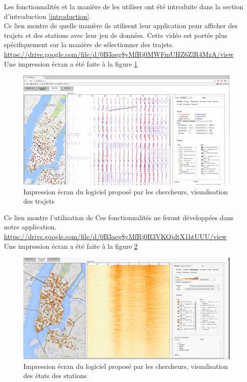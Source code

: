 \documentclass[12pt]{article}
\begin{document}
	Les fonctionnalités et la manière de les utiliser ont été introduite dans la section
	d'introduction \ref{introduction}.\\

	Ce lien montre de quelle manière ils utilisent leur application pour afficher des trajets et
	des stations avec leur jeu de données. Cette vidéo est portée plus spécifiquement sur la manière
	de sélectionner des trajets.\\
	\url{https://drive.google.com/file/d/0B3aeg8yMfRj0MWFmUHZ6ZlR4MzA/view}\\
	Une impression écran a été faite à la figure \ref{fig:trips_screen}\\
	
	\begin{figure}[!h]
	\begin{center}
	\includegraphics[scale=.3]{existant_trips.png}
	\caption{Impression écran du logiciel proposé par les chercheurs, visualisation des trajets}
	\label{fig:trips_screen}
	\end{center}
	\end{figure}
	
	Ce lien montre l'utilisation de
	Ces fonctionnalités ne feront développées dans notre application.\\
	\url{https://drive.google.com/file/d/0B3aeg8yMfRj0R3VKQjdtX1htUUU/view}\\
	Une impression écran a été faite à la figure \ref{fig:station_screen}\\
	
	\begin{figure}[!h]
	\begin{center}
	\includegraphics[scale=.3]{existant_station_state.png}
	\caption{Impression écran du logiciel proposé par les chercheurs, visualisation des états
	des stations}
	\label{fig:station_screen}
	\end{center}
	\end{figure}
	
\end{document}
